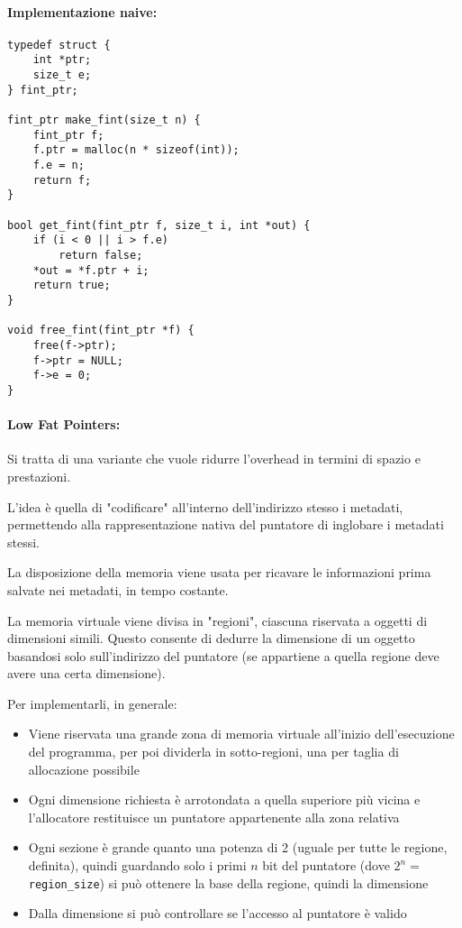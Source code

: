 \vfill

\paragraph{Implementazione naive:}
\begin{verbatim}
typedef struct {
    int *ptr;
    size_t e;
} fint_ptr;

fint_ptr make_fint(size_t n) {
    fint_ptr f;
    f.ptr = malloc(n * sizeof(int));
    f.e = n;
    return f;
}

bool get_fint(fint_ptr f, size_t i, int *out) {
    if (i < 0 || i > f.e)
        return false;
    *out = *f.ptr + i;
    return true;
}

void free_fint(fint_ptr *f) {
    free(f->ptr);
    f->ptr = NULL;
    f->e = 0;
}
\end{verbatim}

\paragraph{Low Fat Pointers:} Si tratta di una variante che vuole ridurre l'overhead in termini di spazio e prestazioni. 

L'idea è quella di "codificare" all'interno dell'indirizzo stesso i metadati, permettendo alla rappresentazione nativa del puntatore di inglobare i metadati stessi. 

La disposizione della memoria viene usata per ricavare le informazioni prima salvate nei metadati, in tempo costante.

La memoria virtuale viene divisa in "regioni", ciascuna riservata a oggetti di dimensioni simili. Questo consente di dedurre la dimensione di un oggetto basandosi solo sull'indirizzo del puntatore (se appartiene a quella regione deve avere una certa dimensione).

Per implementarli, in generale:
\begin{itemize}
    \item Viene riservata una grande zona di memoria virtuale all'inizio dell'esecuzione del programma, per poi dividerla in sotto-regioni, una per taglia di allocazione possibile
    
    \item Ogni dimensione richiesta è arrotondata a quella superiore più vicina e l'allocatore restituisce un puntatore appartenente alla zona relativa
    
    \item Ogni sezione è grande quanto una potenza di 2 (uguale per tutte le regione, definita), quindi guardando solo i primi $n$ bit del puntatore (dove $2^n = $ \texttt{region\_size}) si può ottenere la base della regione, quindi la dimensione
    
    \item Dalla dimensione si può controllare se l'accesso al puntatore è valido
\end{itemize}

